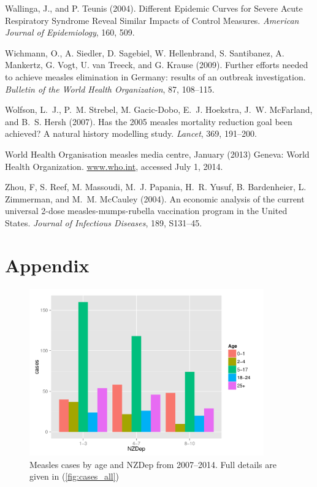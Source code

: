 \documentclass{article}
\begin{document}
\begin{thebibliography}{}
Wallinga, J., and P. Teunis (2004).
\newblock Different Epidemic Curves for Severe Acute Respiratory Syndrome Reveal Similar Impacts of Control Measures.
\newblock \emph{American Journal of Epidemiology}, 160, 509.

Wichmann, O., A. Siedler, D. Sagebiel, W. Hellenbrand, S. Santibanez, A. Mankertz, G. Vogt, U. van Treeck, and G. Krause (2009).
\newblock Further efforts needed to achieve measles elimination in Germany: results of an outbreak investigation.
\newblock \emph{Bulletin of the World Health Organization}, 87, 108--115.

Wolfson, L.~J., P.~M. Strebel, M. Gacic-Dobo, E.~J. Hoekstra, J.~W. McFarland, and B.~S. Hersh (2007).
\newblock Has the 2005 measles mortality reduction goal been achieved? A natural history modelling study.
\newblock \emph{Lancet}, 369, 191--200.

World Health Organisation measles media centre, January (2013)
\newblock Geneva: World Health Organization.
\href{http://www.who.int/mediacentre/news/notes/2013/measles_20130117/en/}{www.who.int}, accessed July 1, 2014.

Zhou, F, S. Reef, M. Massoudi, M.~J. Papania, H.~R. Yusuf, B. Bardenheier, L. Zimmerman, and M.~M. McCauley (2004).
\newblock An economic analysis of the current universal 2-dose measles-mumps-rubella vaccination program in the United States.
\newblock \emph{Journal of Infectious Diseases}, 189, S131--45.

\end{thebibliography}

\section{Appendix}
\label{sec:app}

\begin{figure}[H]
     \begin{center}
     \includegraphics[width=0.9\textwidth]{case_age_nzdep.pdf}
     \end{center}
     \caption{Measles cases by age and NZDep from 2007--2014. Full details are given in (\autoref{fig:cases_all})}
     \label{fig:CaseAgeNzdep}
\end{figure}
\end{document}
